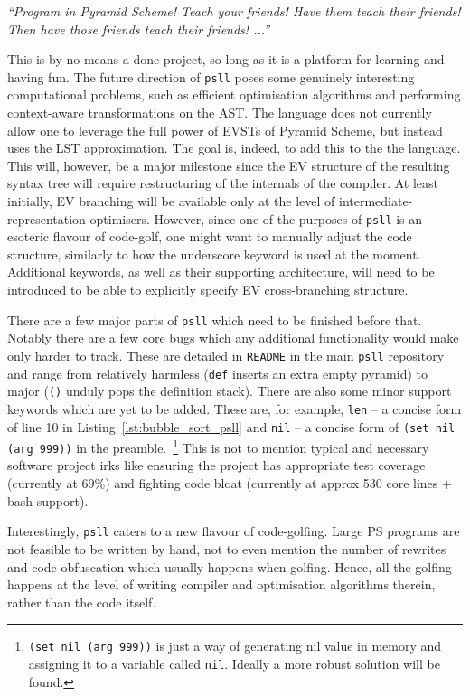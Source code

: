 \documentclass[aip,jcp,reprint,footinbib]{revtex4-1}
\let\tt\texttt
\newcommand\psll{\texttt{psll}\xspace}
\newcommand{\ilpsll}[1]{\lstinline[language=psll,columns=flexible]{#1}}
\begin{document}
\textit{\enquote{Program in Pyramid Scheme! Teach your friends! Have them teach \emph{their} friends! Then have those friends teach \emph{their} friends! ...}}

This is by no means a done project, so long as it is a platform for learning and having fun. The future direction of \psll poses some genuinely interesting computational problems, such as efficient optimisation algorithms and performing context-aware transformations on the AST. The language does not currently allow one to leverage the full power of EVSTs of Pyramid Scheme, but instead uses the LST approximation. The goal is, indeed, to add this to the the language. This will, however, be a major milestone since the EV structure of the resulting syntax tree will require restructuring of the internals of the compiler. At least initially, EV branching will be available only at the level of intermediate-representation optimisers. However, since one of the purposes of \psll is an esoteric flavour of code-golf, one might want to manually adjust the code structure, similarly to how the underscore keyword is used at the moment. Additional keywords, as well as their supporting architecture, will need to be introduced to be able to explicitly specify EV cross-branching structure.

There are a few major parts of \psll which need to be finished before that. Notably there are a few core bugs which any additional functionality would make only harder to track. These are detailed in \tt{README} in the main \psll repository and range from relatively harmless (\tt{def} inserts an extra empty pyramid) to major (\tt{()} unduly pops the definition stack). There are also some minor support keywords which are yet to be added. These are, for example, \tt{len} -- a concise form of line 10 in Listing~\ref{lst:bubble_sort_psll} and \tt{nil} -- a concise form of \ilpsll{(set nil (arg 999))} in the preamble.~\footnote{\tt{(set nil (arg 999))} is just a way of generating nil value in memory and assigning it to a variable called \tt{nil}. Ideally a more robust solution will be found.} This is not to mention typical and necessary software project irks like ensuring the project has appropriate test coverage (currently at 69\%) and fighting code bloat (currently at approx 530 core lines + bash support).

Interestingly, \psll caters to a new flavour of code-golfing. Large PS programs are not feasible to be written by hand, not to even mention the number of rewrites and code obfuscation which usually happens when golfing. Hence, all the golfing happens at the level of writing compiler and optimisation algorithms therein, rather than the code itself.~\cite{psnegation_answer}
\end{document}

